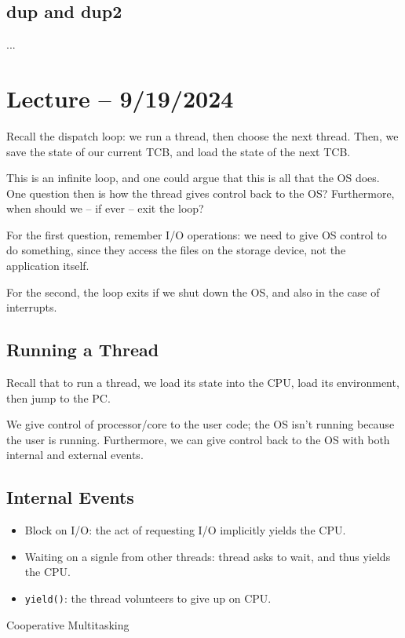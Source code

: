 \documentclass[openany]{book}
\begin{document}
\subsection{dup and dup2}
...

\section{Lecture -- 9/19/2024}
Recall the dispatch loop: we run a thread, then choose the next thread. Then, we save the state of our current TCB, and load the state of the next TCB.

This is an infinite loop, and one could argue that this is all that the OS does. One question then is how the thread gives control back to the OS? Furthermore, when should we -- if ever -- exit the loop?

For the first question, remember I/O operations: we need to give OS control to do something, since they access the files on the storage device, not the application itself.

For the second, the loop exits if we shut down the OS, and also in the case of interrupts.

\subsection{Running a Thread}
Recall that to run a thread, we load its state into the CPU, load its environment, then jump to the PC.

\begin{rmk}
	We give control of processor/core to the user code; the OS isn't running because the user is running. Furthermore, we can give control back to the OS with both internal and external events.
\end{rmk}

\subsection{Internal Events}
\begin{itemize}
	\item Block on I/O: the act of requesting I/O implicitly yields the CPU.
	\item Waiting on a signle from other threads: thread asks to wait, and thus yields the CPU.
	\item \texttt{yield()}: the thread volunteers to give up on CPU.
\end{itemize}

\begin{rmk}
	Cooperative Multitasking
\end{rmk}
\end{document}

